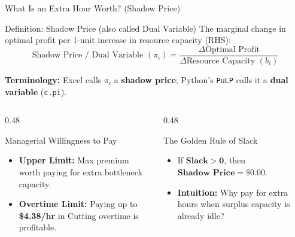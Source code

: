 \documentclass{beamer}
\begin{document}
\begin{frame}{What Is an Extra Hour Worth? (Shadow Price)}
\begin{block}{Definition: Shadow Price (also called Dual Variable)}
\small
\setlength{\abovedisplayskip}{4pt}\setlength{\belowdisplayskip}{4pt}
The marginal change in optimal profit per 1-unit increase in resource capacity (RHS):
\[
\text{Shadow Price / Dual Variable } (\pi_i) = \frac{\Delta \text{Optimal Profit}}{\Delta \text{Resource Capacity } (b_i)}
\]

\footnotesize \textbf{Terminology:} Excel calls $\pi_i$ a \textbf{shadow price}; Python's \texttt{PuLP} calls it a \textbf{dual variable} (\texttt{c.pi}).\par
\end{block}

\vspace{0.1em}
\begin{columns}[T]
\begin{column}{0.48\textwidth}
\begin{block}{Managerial Willingness to Pay}
\small
\begin{itemize}\setlength{\itemsep}{0.15em}
  \item \textbf{Upper Limit:} Max premium worth paying for extra bottleneck capacity.
  \item \textbf{Overtime Limit:} Paying up to \textbf{\$4.38/hr} in Cutting overtime is profitable.
\end{itemize}
\end{block}
\end{column}

\begin{column}{0.48\textwidth}
\begin{alertblock}{The Golden Rule of Slack}
\small
\begin{itemize}\setlength{\itemsep}{0.15em}
  \item If $\mathbf{\text{Slack} > 0}$, then $\mathbf{\text{Shadow Price} = \$0.00}$.
  \item \textbf{Intuition:} Why pay for extra hours when surplus capacity is already idle?
\end{itemize}
\end{alertblock}
\end{column}
\end{columns}
\end{frame}
\end{document}
